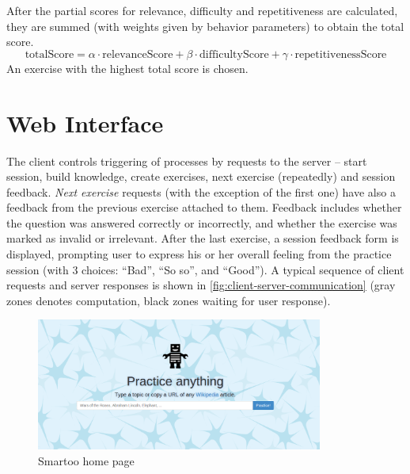 \documentclass[12pt, twoside]{fithesis2}
\renewcommand{\_}{\leavevmode \kern0.07em\vbox{\hrule width0.4em}}
\newcounter{choice}
\begin{document}
After the partial scores for relevance, difficulty and repetitiveness are calculated,
they are summed (with weights given by behavior parameters) to obtain the total score.
$$
\text{totalScore} = \alpha \cdot \text{relevanceScore} + \beta \cdot \text{difficultyScore} + \gamma \cdot \text{repetitivenessScore}
$$
An exercise with the highest total score is chosen.





\section{Web Interface}
\label{sec:smartoo-web}

The client controls triggering of processes by requests to the server -- start session, build knowledge, create exercises, next exercise (repeatedly) and session feedback.
\emph{Next exercise} requests (with the exception of the first one) have also a feedback from the previous exercise attached to them.
Feedback includes whether the question was answered correctly or incorrectly, and whether the exercise was marked as invalid or irrelevant.
After the last exercise, a session feedback form is displayed, prompting user to express his or her overall feeling from the practice session (with 3 choices: ``Bad'', ``So so'', and ``Good'').
A typical sequence of client requests and server responses is shown in
\autoref{fig:client-server-communication} (gray zones denotes computation, black zones waiting for user response).

\begin{figure}[h]
  \centering
  \includegraphics[width=0.84\textwidth]{images/home-page.png}
  \caption{Smartoo home page}
  \label{fig:smartoo-home}
\end{figure}
\end{document}
